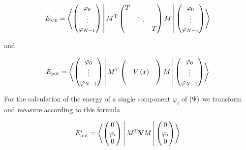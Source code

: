 \begin{equation}
  E_{\text{kin}} =
  \Braket{
    \begin{pmatrix}
      \varphi_0 \\
      \vdots \\
      \varphi_{N-1}
    \end{pmatrix}
    |
    M{}^{\textnormal{T}}
    \begin{pmatrix}
      T  & {}     & {} \\
      {} & \ddots & {} \\
      {} & {}     & T  \\
    \end{pmatrix}
    M
    |
    \begin{pmatrix}
      \varphi_0 \\
      \vdots \\
      \varphi_{N-1}
    \end{pmatrix}
  }
\end{equation}

and

\begin{equation}
  E_{\text{pot}} =
  \Braket{
    \begin{pmatrix}
      \varphi_0 \\
      \vdots \\
      \varphi_{N-1}
    \end{pmatrix}
    |
    M{}^{\textnormal{T}}
    \begin{pmatrix}
      {} & {}       & {} \\
      {} & V\left( x \right) & {} \\
      {} & {}       & {} \\
    \end{pmatrix}
    M
    |
    \begin{pmatrix}
      \varphi_0 \\
      \vdots \\
      \varphi_{N-1}
    \end{pmatrix}
  }
\end{equation}

For the calculation of the energy of a single component $\varphi_i$
of $\Ket{\Psi}$ we transform and measure according to this formula

\begin{equation}
  E_{\text{pot}}^i =
  \Braket{
    \begin{pmatrix}
      0 \\
      \varphi_i \\
      0
    \end{pmatrix}
    |
    M{}^{\textnormal{T}}
    \mathbf{V}
    M
    |
    \begin{pmatrix}
      0 \\
      \varphi_i \\
      0
    \end{pmatrix}
  }
\end{equation}

